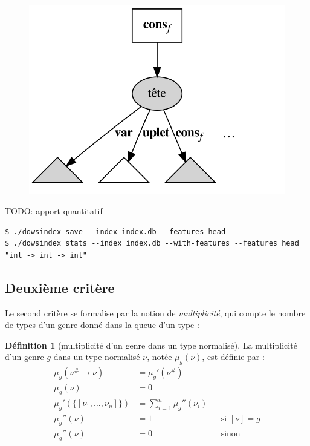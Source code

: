\documentclass[a4paper]{report}
\theoremstyle{definition}
\newtheorem{definition}[theoreme]{Définition}
\newcommand{\mset}[1]{\{\![#1]\!\}}
\begin{document}
\begin{figure}[h]
\begin{center}
		\includegraphics[scale=0.13]{graphs/crit1_3}
	\end{center}
	\caption{\label{fig_crit1}}
\end{figure}

TODO: apport quantitatif

\begin{verbatim}
$ ./dowsindex save --index index.db --features head
$ ./dowsindex stats --index index.db --with-features --features head "int -> int -> int"
\end{verbatim}


\subsection{Deuxième critère}

Le second critère se formalise par la notion de \emph{multiplicité}, qui compte le nombre de types d'un genre donné dans la queue d'un type :

\begin{definition}[multiplicité d'un genre dans un type normalisé]
	La multiplicité d'un genre $g$ dans un type normalisé $\nu$, notée $\mu_g (\nu)$, est définie par :
	\begin{align*}
			\mu_g (\nu^\# \rightarrow \nu) &=
			\mu_g' (\nu^\#)
		\\
			\mu_g (\nu) &=
			0
		\\
			\mu_g' (\mset{\nu_1, \dots, \nu_n}) &=
			\sum_{i=1}^n \mu_g'' (\nu_i)
		\\
			\mu_g'' (\nu) &=
			1 &&
			\text{si } [\nu] = g
		\\
			\mu_g'' (\nu) &=
			0 &&
			\text{sinon}
	\end{align*}
\end{definition}
\end{document}
